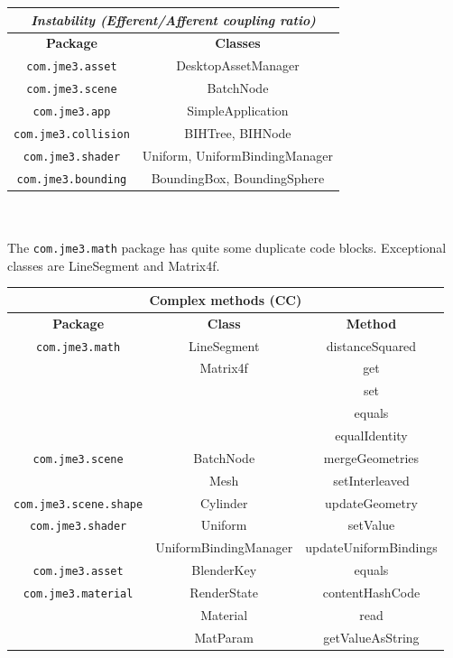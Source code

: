 \documentclass[a4paper, 10pt]{article}
\begin{document}
\begin{tabular}{|c|c|}
\hline
\multicolumn{2}{|c|}{\textit{Instability (Efferent/Afferent coupling ratio)}}\\
\hline
\textbf{Package} & \textbf{Classes}\\
\hline
\verb|com.jme3.asset|		& DesktopAssetManager\\
\hline
\verb|com.jme3.scene|		& BatchNode\\
\hline
\verb|com.jme3.app|	        & SimpleApplication\\
\hline
\verb|com.jme3.collision|	& BIHTree, BIHNode\\
\hline
\verb|com.jme3.shader|		& Uniform, UniformBindingManager\\
\hline
\verb|com.jme3.bounding|	& BoundingBox, BoundingSphere\\
\hline
\end{tabular}\\\\

The \verb|com.jme3.math| package has quite some duplicate 
code blocks. Exceptional classes are LineSegment and Matrix4f.

\begin{tabular}{|c|c|c|}
\hline
\multicolumn{3}{|c|}{\bfseries Complex methods (CC)}\\
\hline
\textbf{Package}&\textbf{Class}&\textbf{Method}\\
\hline
\verb|com.jme3.math|	        & LineSegment	        & distanceSquared\\
\hline
			        & Matrix4f	        & get\\
\hline
			        &			& set\\
\hline
			        &			& equals\\
\hline
                                &			& equalIdentity\\
\hline
\verb|com.jme3.scene|	        & BatchNode	        & mergeGeometries\\
\hline
			        & Mesh		        & setInterleaved\\
\hline
\verb|com.jme3.scene.shape|	& Cylinder	        & updateGeometry\\
\hline
\verb|com.jme3.shader|	        & Uniform	        & setValue\\
\hline
				& UniformBindingManager	& updateUniformBindings\\
\hline
\verb|com.jme3.asset|	        & BlenderKey	        & equals\\
\hline
\verb|com.jme3.material|	& RenderState	        & contentHashCode\\
\hline
				& Material	        & read\\
\hline
				& MatParam	        & getValueAsString\\
\hline
\end{tabular}
\end{document}
